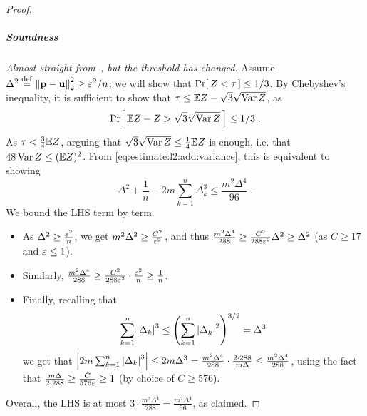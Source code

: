 \begin{proof}
\subparagraph{Soundness} \textit{\emph{Almost} straight from~\cite{DKN:15}, but the threshold has changed.}
Assume $\Delta^2\stackrel{\rm def}{=}{\lVert\mathbf{p}-\mathbf{u}{\rVert}}_2^2 \geq \varepsilon^2/n$; we will show that $\Pr\!\left[\,  Z < \tau \, \right] \leq 1/3$. By Chebyshev's inequality, it is sufficient to show that
$\tau \leq \mathbb{E} Z - \sqrt{3}\sqrt{\operatorname{Var} Z}$, as \[
    \Pr\!\left[\,  \mathbb{E} Z - Z > \sqrt{3}\sqrt{\operatorname{Var} Z} \, \right] \leq 1/3\;.
\]
As $\tau < \frac{3}{4}\mathbb{E} Z$, arguing that $\sqrt{3}\sqrt{\operatorname{Var} Z} \leq \frac{1}{4}\mathbb{E} Z$ is enough, i.e. that $48\operatorname{Var} Z \leq (\mathbb{E} Z)^2$. From \eqref{eq:estimate:l2:add:variance}, this is equivalent to showing
\[
    \Delta^2 + \frac{1}{n} -2 m\sum_{k=1}^n \Delta_k^3 \leq \frac{m^2\Delta^4}{96}\;.
\]
We bound the LHS term by term.
\begin{itemize}
  \item As $\Delta^2 \geq \frac{\varepsilon^2}{n}$, we get $m^2\Delta^2 \geq \frac{C^2}{\varepsilon^2}$, and thus $\frac{m^2\Delta^4}{288} \geq \frac{C^2}{288\varepsilon^2}\Delta^2 \geq \Delta^2$ (as $C \geq 17$ and $\varepsilon \leq 1$).
  \item Similarly, $\frac{m^2\Delta^4}{288} \geq \frac{C^2}{288\varepsilon^2}\cdot \frac{\varepsilon^2}{n} \geq \frac{1}{n}$. 
  \item Finally, recalling that\footnotemark
  \[
    \sum_{k=1}^n \left\lvert \Delta_k \right\rvert^3 \leq \left( \sum_{k=1}^n \left\lvert \Delta_k \right\rvert^2 \right)^{3/2} = \Delta^3
  \]
  we get that $\left\lvert 2m\sum_{k=1}^n \left\lvert \Delta_k \right\rvert^3 \right\rvert \leq 2m \Delta^3 = \frac{m^2 \Delta^4}{288} \cdot \frac{2\cdot 288}{m\Delta} \leq \frac{m^2 \Delta^4}{288}$, using the fact that
  $\frac{m\Delta}{2\cdot 288} \geq \frac{C}{576\varepsilon} \geq 1$ (by choice of $C \geq 576$).
\end{itemize}
Overall, the LHS is at most $3\cdot \frac{m^2 \Delta^4}{288} = \frac{m^2 \Delta^4}{96}$, as claimed.




\end{proof}
